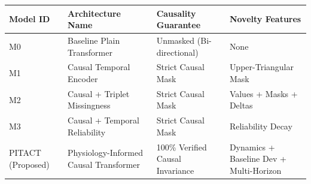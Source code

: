 \begin{tabular}{llll}
\toprule
Model ID & Architecture Name & Causality Guarantee & Novelty Features \\
\midrule
M0 & Baseline Plain Transformer & Unmasked (Bi-directional) & None \\
M1 & Causal Temporal Encoder & Strict Causal Mask & Upper-Triangular Mask \\
M2 & Causal + Triplet Missingness & Strict Causal Mask & Values + Masks + Deltas \\
M3 & Causal + Temporal Reliability & Strict Causal Mask & Reliability Decay \\
PITACT (Proposed) & Physiology-Informed Causal Transformer & 100\% Verified Causal Invariance & Dynamics + Baseline Dev + Multi-Horizon \\
\bottomrule
\end{tabular}
